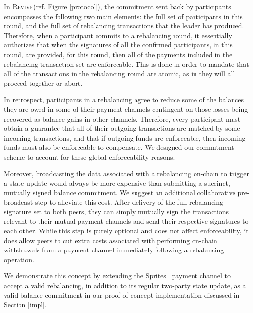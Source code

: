 \documentclass[sigconf]{acmart}
\newcommand{\name}{\textsc{Revive}\xspace}
\begin{document}
In \name (ref. Figure \ref{protocol}), the commitment sent back by participants encompasses the following two main elements: the full set of participants in this round, and the full set of rebalancing transactions that the leader has produced. Therefore, when a participant commits to a rebalancing round, it essentially authorizes that when the signatures of all the confirmed participants, in this round, are provided, for this round, then all of the payments included in the rebalancing transaction set are enforceable. This is done in order to mandate that all of the transactions in the rebalancing round are atomic, as in they will all proceed together or abort.

In retrospect, participants in a rebalancing agree to reduce some of the balances they are owed in some of their payment channels contingent on those losses being recovered as balance gains in other channels. Therefore, every participant must obtain a guarantee that all of their outgoing transactions are matched by some incoming transactions, and that if outgoing funds are enforceable, then incoming funds must also be enforceable to compensate. We designed our commitment scheme to account for these global enforceability reasons.

Moreover, broadcasting the data associated with a rebalancing on-chain to trigger a state update would always be more expensive than submitting a succinct, mutually signed balance commitment. We suggest an additional collaborative pre-broadcast step to alleviate this cost. After delivery of the full rebalancing signature set to both peers, they can simply mutually sign the transactions relevant to their mutual payment channels and send their respective signatures to each other.  While this step is purely optional and does not affect enforceability, it does allow peers to cut extra costs associated with performing on-chain withdrawals from a payment channel immediately following a rebalancing operation.

We demonstrate this concept by extending the Sprites~\cite{sprites} payment channel to accept a valid rebalancing, in addition to its regular two-party state update, as a valid balance commitment in our proof of concept implementation discussed in Section \ref{impl}.

\end{document}
